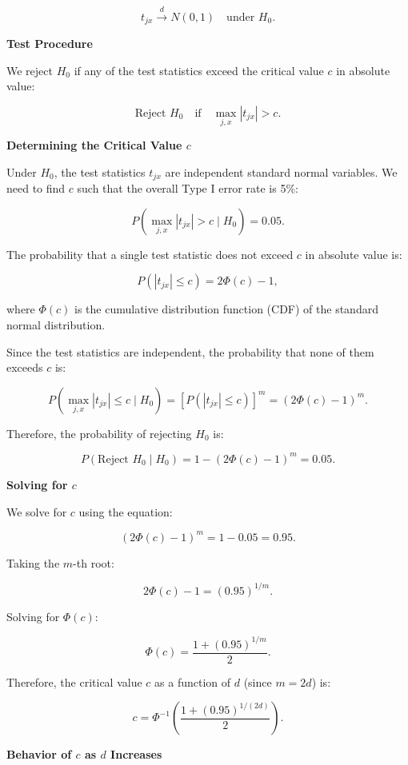 \documentclass{article}
\begin{document}
\[
t_{jx} \xrightarrow{d} N(0,1) \quad \text{under } H_0.
\]

\textbf{Test Procedure}

We reject \( H_0 \) if any of the test statistics exceed the critical value \( c \) in absolute value:

\[
\text{Reject } H_0 \quad \text{if} \quad \max_{j,x} |t_{jx}| > c.
\]

\textbf{Determining the Critical Value \( c \)}

Under \( H_0 \), the test statistics \( t_{jx} \) are independent standard normal variables. We need to find \( c \) such that the overall Type I error rate is 5\%:

\[
P\left( \max_{j,x} |t_{jx}| > c \mid H_0 \right) = 0.05.
\]

The probability that a single test statistic does not exceed \( c \) in absolute value is:

\[
P\left( |t_{jx}| \leq c \right) = 2\Phi(c) - 1,
\]

where \( \Phi(c) \) is the cumulative distribution function (CDF) of the standard normal distribution.

Since the test statistics are independent, the probability that none of them exceeds \( c \) is:

\[
P\left( \max_{j,x} |t_{jx}| \leq c \mid H_0 \right) = \left[ P\left( |t_{jx}| \leq c \right) \right]^m = \left( 2\Phi(c) - 1 \right)^m.
\]

Therefore, the probability of rejecting \( H_0 \) is:

\[
P\left( \text{Reject } H_0 \mid H_0 \right) = 1 - \left( 2\Phi(c) - 1 \right)^m = 0.05.
\]

\textbf{Solving for \( c \)}

We solve for \( c \) using the equation:

\[
\left( 2\Phi(c) - 1 \right)^m = 1 - 0.05 = 0.95.
\]

Taking the \( m \)-th root:

\[
2\Phi(c) - 1 = (0.95)^{1/m}.
\]

Solving for \( \Phi(c) \):

\[
\Phi(c) = \frac{1 + (0.95)^{1/m}}{2}.
\]

Therefore, the critical value \( c \) as a function of \( d \) (since \( m = 2d \)) is:

\[
c = \Phi^{-1}\left( \frac{1 + (0.95)^{1/(2d)}}{2} \right).
\]

\textbf{Behavior of \( c \) as \( d \) Increases}
\end{document}
